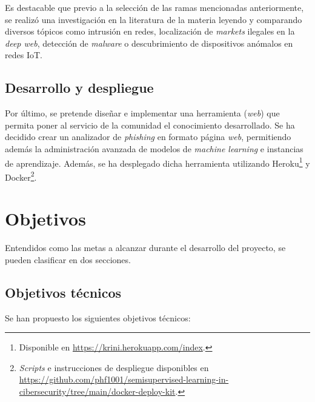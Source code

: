Es destacable que previo a la selección de las ramas mencionadas anteriormente, se realizó una investigación en la literatura de la materia leyendo y comparando diversos tópicos como intrusión en redes, localización de \textit{markets} ilegales en la \textit{deep web}, detección de \textit{malware} o descubrimiento de dispositivos anómalos en redes IoT.

\subsection{Desarrollo y despliegue}

Por último, se pretende diseñar e implementar una herramienta (\textit{web}) que permita poner al servicio de la comunidad el conocimiento desarrollado. Se ha decidido crear un analizador de \textit{phishing} en formato página \textit{web}, permitiendo además la administración avanzada de modelos de \textit{machine learning} e instancias de aprendizaje. Además, se ha desplegado dicha herramienta utilizando Heroku\footnote{Disponible en \url{https://krini.herokuapp.com/index}.} y Docker\footnote{\textit{Scripts} e instrucciones de despliegue disponibles en \url{https://github.com/phf1001/semisupervised-learning-in-cibersecurity/tree/main/docker-deploy-kit}.}.

\section{Objetivos}

Entendidos como las metas a alcanzar durante el desarrollo del proyecto, se pueden clasificar en dos secciones.

\subsection{Objetivos técnicos}
\label{Objetivos técnicos}

Se han propuesto los siguientes objetivos técnicos:

